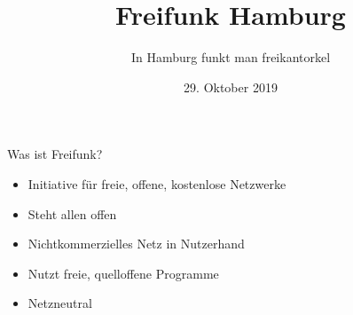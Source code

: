 \documentclass[t]{beamer}
\title{Freifunk Hamburg}
\author{In Hamburg funkt man frei\newline\newline\newline\newline\newline\newline\newline\newline kantorkel}
\date{29. Oktober 2019}
\begin{document}
  \maketitle
  
  \begin{frame}{Was ist Freifunk?}
    \begin{itemize}
      \item Initiative für freie, offene, kostenlose Netzwerke
      \item Steht allen offen
      \item Nichtkommerzielles Netz in Nutzerhand
      \item Nutzt freie, quelloffene Programme
      \item Netzneutral
    \end{itemize}
  \end{frame}
  
\end{document}
